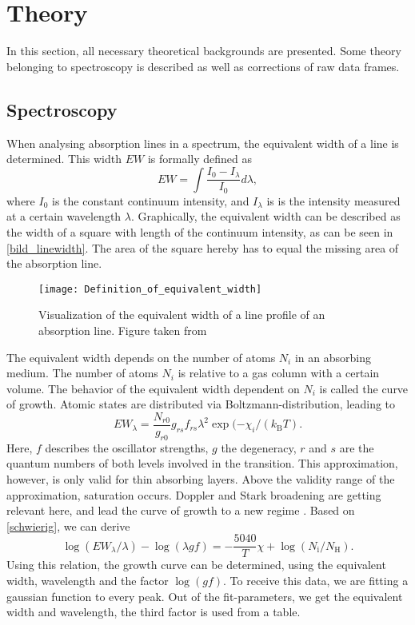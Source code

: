 \section{Theory}
\label{sec:theorie}
In this section, all necessary theoretical backgrounds are presented. Some theory belonging to spectroscopy is described as well as corrections of raw data frames.
\subsection{Spectroscopy}


When analysing absorption lines in a spectrum, the equivalent width of a line is determined. This width $EW$ is formally defined as 
\begin{equation}
	EW=\int \frac{I_0-I_\lambda}{I_0}d\lambda,
\end{equation}
where $I_0$ is the constant continuum intensity, and $I_\lambda$ is is the intensity measured at a certain wavelength $\lambda$. Graphically, the equivalent width can be described as the width of a square with length of the continuum intensity, as can be seen in \autoref{bild_linewidth}. The area of the square hereby has to equal the missing area of the absorption line. 

\begin{figure}[H]
	\centering
	\texttt{[image: Definition\_of\_equivalent\_width]}
	\caption{Visualization of the equivalent width of a line profile of an absorption line. Figure taken from \cite{bild_linewidth} }
	\label{bild_linewidth}
\end{figure}
The equivalent width depends on the number of atoms $N_i$ in an absorbing medium. The number of atoms $N_i$ is relative to a gas column with a certain volume. The behavior of the equivalent width dependent on $N_i$ is called the curve of growth. Atomic states are distributed via Boltzmann-distribution, leading to
\begin{equation}
	EW_\lambda=\frac{N_{r0}}{g_{r0}}g_{rs}f_{rs}\lambda^2 \exp{(-\chi_i/(k_{\mathrm{B}}T)}. \label{schwierig}
\end{equation}
Here, $f$ describes the oscillator strengths, $g$ the degeneracy, $r$ and $s$ are the quantum numbers of both levels involved in the transition. This approximation, however, is only valid for thin absorbing layers. Above the validity range of the approximation, saturation occurs. Doppler and Stark broadening are getting relevant here, and lead the curve of growth to a new regime \cite{spectroscopy}.
Based on \autoref{schwierig}, we can derive 
\begin{equation}\label{eqn:line}
	\log(EW_\lambda/\lambda)-\log(\lambda g f)=-\frac{5040}{T}\chi+\log(N_\mathrm{i}/N_\mathrm{H}). 
\end{equation}
Using this relation, the growth curve can be determined, using the equivalent width, wavelength and the factor $\log{(gf)}$. To receive this data, we are fitting a gaussian function to every peak. Out of the fit-parameters, we get the equivalent width and wavelength, the third factor is used from a table. 
